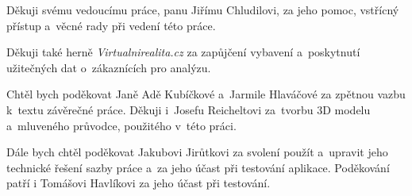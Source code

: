 Děkuji svému vedoucímu práce, panu Jiřímu Chludilovi, za jeho pomoc, vstřícný přístup a~věcné rady při vedení této práce.

Děkuji také herně \emph{Virtualnirealita.cz} za zapůjčení vybavení a~poskytnutí užitečných dat o~zákaznících pro analýzu.

Chtěl bych poděkovat Janě Adě Kubíčkové a~Jarmile Hlaváčové za zpětnou vazbu k~textu závěrečné práce. Děkuji i~Josefu Reicheltovi za~tvorbu 3D modelu a~mluveného průvodce, použitého v~této práci. 

Dále bych chtěl poděkovat Jakubovi Jirůtkovi za svolení použít a~upravit jeho technické řešení sazby práce a~za jeho účast při testování aplikace. Poděkování patří i Tomášovi Havlíkovi za jeho účast při testování.